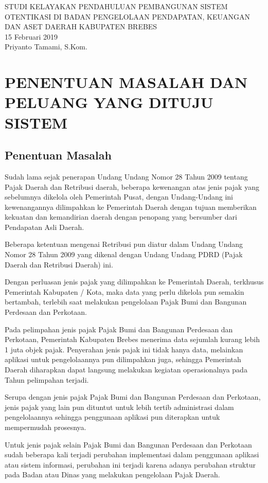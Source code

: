 \documentclass[pdftex,12pt, oneside]{article}
\begin{document}
%
\begin{center}
{\large STUDI KELAYAKAN PENDAHULUAN PEMBANGUNAN SISTEM OTENTIKASI DI BADAN PENGELOLAAN PENDAPATAN, KEUANGAN DAN ASET DAERAH KABUPATEN BREBES}
\\[1cm]
15 Februari 2019\\
Priyanto Tamami, S.Kom.
\end{center}

\section{PENENTUAN MASALAH DAN PELUANG YANG DITUJU SISTEM}

\subsection{Penentuan Masalah}

Sudah lama sejak penerapan Undang Undang Nomor 28 Tahun 2009 tentang Pajak Daerah dan Retribusi daerah, beberapa kewenangan atas jenis pajak yang sebelumnya dikelola oleh Pemerintah Pusat, dengan Undang-Undang ini kewenangannya dilimpahkan ke Pemerintah Daerah dengan tujuan memberikan kekuatan dan kemandirian daerah dengan penopang yang bersumber dari Pendapatan Asli Daerah.

Beberapa ketentuan mengenai Retribusi pun diatur dalam Undang Undang Nomor 28 Tahun 2009 yang dikenal dengan Undang Undang PDRD (Pajak Daerah dan Retribusi Daerah) ini.

Dengan perluasan jenis pajak yang dilimpahkan ke Pemerintah Daerah, terkhusus Pemerintah Kabupaten / Kota, maka data yang perlu dikelola pun semakin bertambah, terlebih saat melakukan pengelolaan Pajak Bumi dan Bangunan Perdesaan dan Perkotaan.

Pada pelimpahan jenis pajak Pajak Bumi dan Bangunan Perdesaan dan Perkotaan, Pemerintah Kabupaten Brebes menerima data sejumlah kurang lebih 1 juta objek pajak. Penyerahan jenis pajak ini tidak hanya data, melainkan aplikasi untuk pengelolaannya pun dilimpahkan juga, sehingga Pemerintah Daerah diharapkan dapat langsung melakukan kegiatan operasionalnya pada Tahun pelimpahan terjadi.

Serupa dengan jenis pajak Pajak Bumi dan Bangunan Perdesaan dan Perkotaan, jenis pajak yang lain pun dituntut untuk lebih tertib administrasi dalam pengelolaannya sehingga penggunaan aplikasi pun diterapkan untuk mempermudah prosesnya.

Untuk jenis pajak selain Pajak Bumi dan Bangunan Perdesaan dan Perkotaan sudah beberapa kali terjadi perubahan implementasi dalam penggunaan aplikasi atau sistem informasi, perubahan ini terjadi karena adanya perubahan struktur pada Badan atau Dinas yang melakukan pengelolaan Pajak Daerah. 
\end{document}
